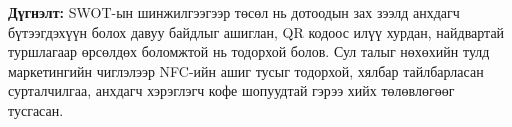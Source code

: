 \noindent\textbf{Дүгнэлт:} SWOT-ын шинжилгээгээр төсөл нь дотоодын зах
зээлд анхдагч бүтээгдэхүүн болох давуу байдлыг ашиглан, QR кодоос
илүү хурдан, найдвартай туршлагаар өрсөлдөх боломжтой нь тодорхой
болов. Сул талыг нөхөхийн тулд маркетингийн чиглэлээр NFC-ийн ашиг
тусыг тодорхой, хялбар тайлбарласан сурталчилгаа, анхдагч хэрэглэгч
кофе шопуудтай гэрээ хийх төлөвлөгөөг тусгасан.
